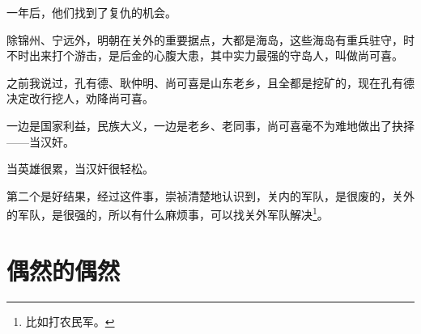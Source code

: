 \begin{multicols}{\theparacolNo}
一年后，他们找到了复仇的机会。

除锦州、宁远外，明朝在关外的重要据点，大都是海岛，这些海岛有重兵驻守，时不时出来打个游击，是后金的心腹大患，其中实力最强的守岛人，叫做尚可喜。

之前我说过，孔有德、耿仲明、尚可喜是山东老乡，且全都是挖矿的，现在孔有德决定改行挖人，劝降尚可喜。

一边是国家利益，民族大义，一边是老乡、老同事，尚可喜毫不为难地做出了抉择——当汉奸。

当英雄很累，当汉奸很轻松。

第二个是好结果，经过这件事，崇祯清楚地认识到，关内的军队，是很废的，关外的军队，是很强的，所以有什么麻烦事，可以找关外军队解决\footnote{比如打农民军。}。
\ifnum{}
	\end{multicols}
\fi
\newpage
\section{偶然的偶然}
\ifnum{}

